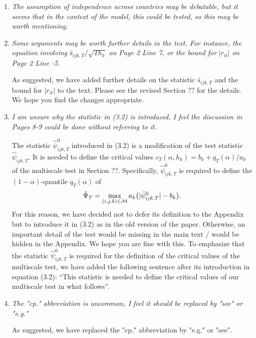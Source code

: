 \documentclass[a4paper,12pt]{article}
\begin{document}
\begin{enumerate}[label=(\arabic*),leftmargin=0.7cm]

\item \textit{The assumption of independence across countries may be debatable, but it seems that in the context of the model, this could be tested, so this may be worth mentioning.}

\item \textit{Some arguments may be worth further details in the text. For instance, the equation involving} $\hat{s}_{ijk,T} / \sqrt{T h_k}$ \textit{on Page 2 Line 7, or the bound for} $|r_{it}|$ \textit{on Page 2 Line -5.}

As suggested, we have added further details on the statistic $\hat{s}_{ijk,T}$ and the bound for $|r_{it}|$ to the text. Please see the revised Section ?? for the details. We hope you find the changes appropriate.  

\item \textit{I am unsure why the statistic in (3.2) is introduced, I feel the discussion in Pages 8-9 could be done without referring to it.}

The statistic $\hat{\psi}_{ijk,T}^0$ introduced in (3.2) is a modification of the test statistic $\hat{\psi}_{ijk,T}$. It is needed to define the critical values $c_T(\alpha,h_k) = b_k + q_T(\alpha) / a_k$ of the multiscale test in Section ??. Specifically, $\hat{\psi}_{ijk,T}^0$ is required to define the $(1-\alpha)$-quantile $q_T(\alpha)$ of 
\[ \hat{\Psi}_T = \max_{(i,j,k) \in \mathcal{M}} a_k \big( |\hat{\psi}_{ijk,T}^0| - b_k \big). \]
For this reason, we have decided not to defer its definition to the Appendix but to introduce it in (3.2) as in the old version of the paper. Otherwise, an important detail of the test would be missing in the main text / would be hidden in the Appendix. We hope you are fine with this. To emphasize that the statistic $\hat{\psi}_{ijk,T}^0$ is required for the definition of the critical values of the multiscale test, we have added the following sentence after its introduction in equation (3.2): ``This statistic is needed to define the critical values of our multiscale test in what follows''.

\item \textit{The "cp." abbreviation is uncommon, I feel it should be replaced by "see" or "e.g."}

As suggested, we have replaced the "cp." abbreviation by "e.g." or "see".
 

\end{enumerate}



\newpage

{\small
\setlength{\bibsep}{0.45em}
}
\end{document}
